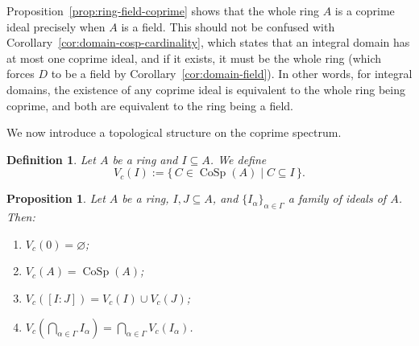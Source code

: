 \documentclass{amsart}
\newtheorem{proposition}{Proposition}
\newtheorem{definition}{Definition}
\begin{document}
Proposition~\ref{prop:ring-field-coprime} shows that the whole ring $A$ is a coprime ideal precisely when $A$ is a field. This should not be confused with Corollary~\ref{cor:domain-cosp-cardinality}, which states that an integral domain has at most one coprime ideal, and if it exists, it must be the whole ring (which forces $D$ to be a field by Corollary~\ref{cor:domain-field}). In other words, for integral domains, the existence of any coprime ideal is equivalent to the whole ring being coprime, and both are equivalent to the ring being a field.

We now introduce a topological structure on the coprime spectrum.

\begin{definition}\label{def:Vc}
Let $A$ be a ring and $I \subseteq A$. We define
\[
V_c(I) := \{\, C \in \operatorname{CoSp}(A) \mid C \subseteq I \,\}.
\]
\end{definition}

\begin{proposition}\label{prop:Vc-properties}
Let $A$ be a ring, $I, J \subseteq A$, and $\{I_\alpha\}_{\alpha \in \Gamma}$ a family of ideals of $A$. Then:
\begin{enumerate}
  \item $V_c(0) = \varnothing$;
  \item $V_c(A) = \operatorname{CoSp}(A)$;
  \item $V_c([I:J]) = V_c(I) \cup V_c(J)$;
  \item $\displaystyle V_c\!\left(\bigcap_{\alpha \in \Gamma} I_\alpha\right) = \bigcap_{\alpha \in \Gamma} V_c(I_\alpha)$.
\end{enumerate}
\end{proposition}
\end{document}

